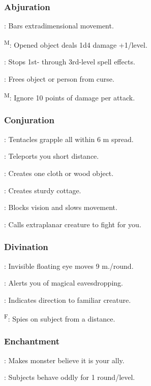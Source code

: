 \subsubsection{Abjuration}
	: Bars extradimensional movement.

	\textsuperscript{M}: Opened object deals 1d4 damage +1/level.

	: Stops 1st- through 3rd-level spell effects.

	: Frees object or person from curse.

	\textsuperscript{M}: Ignore 10 points of damage per attack.

\subsubsection{Conjuration}
	: Tentacles grapple all within 6 m spread.

	: Teleports you short distance.

	: Creates one cloth or wood object.

	: Creates sturdy cottage.

	: Blocks vision and slows movement.

	: Calls extraplanar creature to fight for you.

\subsubsection{Divination}
	: Invisible floating eye moves 9 m./round.

	: Alerts you of magical eavesdropping.

	: Indicates direction to familiar creature.

	\textsuperscript{F}: Spies on subject from a distance.

\subsubsection{Enchantment}
	: Makes monster believe it is your ally.

	: Subjects behave oddly for 1 round/level.

